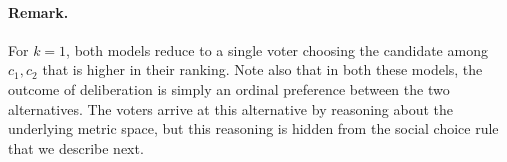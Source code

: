 \paragraph{Remark.} For $k = 1$, both models reduce to a single voter choosing the candidate among $c_1, c_2$ that is higher in their ranking. Note also that in both these models, the outcome of deliberation is simply an ordinal preference between the two alternatives. The voters arrive at this alternative by reasoning about the underlying metric space, but this reasoning is hidden from the social choice rule that we describe next. 
